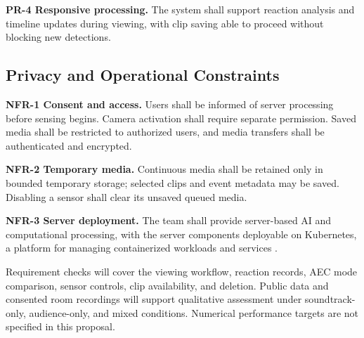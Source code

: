 \textbf{PR-4 Responsive processing.} The system shall support reaction analysis and timeline updates during viewing, with clip saving able to proceed without blocking new detections.

\subsection{Privacy and Operational Constraints}

\textbf{NFR-1 Consent and access.} Users shall be informed of server processing before sensing begins. Camera activation shall require separate permission. Saved media shall be restricted to authorized users, and media transfers shall be authenticated and encrypted.

\textbf{NFR-2 Temporary media.} Continuous media shall be retained only in bounded temporary storage; selected clips and event metadata may be saved. Disabling a sensor shall clear its unsaved queued media.

\textbf{NFR-3 Server deployment.} The team shall provide server-based AI and computational processing, with the server components deployable on Kubernetes, a platform for managing containerized workloads and services \cite{ref27}.

Requirement checks will cover the viewing workflow, reaction records, AEC mode comparison, sensor controls, clip availability, and deletion. Public data and consented room recordings will support qualitative assessment under soundtrack-only, audience-only, and mixed conditions. Numerical performance targets are not specified in this proposal.
